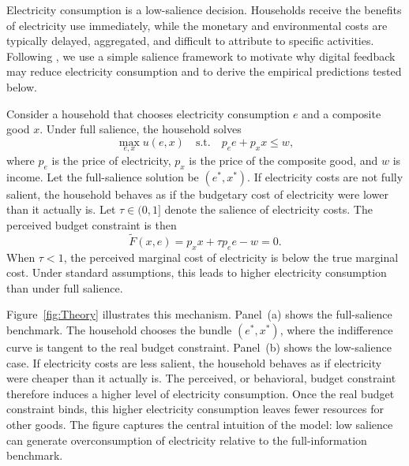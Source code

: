 Electricity consumption is a low-salience decision. Households receive the benefits of electricity use immediately, while the monetary and environmental costs are typically delayed, aggregated, and difficult to attribute to specific activities. Following \citet{alcocerSalienceBiasFramework2024}, we use a simple salience framework to motivate why digital feedback may reduce electricity consumption and to derive the empirical predictions tested below.

Consider a household that chooses electricity consumption \(e\) and a composite good \(x\). Under full salience, the household solves
\[
\max_{e,x} u(e,x)
\quad \text{s.t.} \quad
p_e e + p_x x \leq w,
\]
where \(p_e\) is the price of electricity, \(p_x\) is the price of the composite good, and \(w\) is income. Let the full-salience solution be \((e^*,x^*)\). If electricity costs are not fully salient, the household behaves as if the budgetary cost of electricity were lower than it actually is. Let \(\tau \in (0,1]\) denote the salience of electricity costs. The perceived budget constraint is then
\[
\widetilde F(x,e)=p_xx+\tau p_e e-w=0.
\]
When \(\tau<1\), the perceived marginal cost of electricity is below the true marginal cost. Under standard assumptions, this leads to higher electricity consumption than under full salience.

Figure~\ref{fig:Theory} illustrates this mechanism. Panel~(a) shows the full-salience benchmark. The household chooses the bundle \((e^*,x^*)\), where the indifference curve is tangent to the real budget constraint. Panel~(b) shows the low-salience case. If electricity costs are less salient, the household behaves as if electricity were cheaper than it actually is. The perceived, or behavioral, budget constraint therefore induces a higher level of electricity consumption. Once the real budget constraint binds, this higher electricity consumption leaves fewer resources for other goods. The figure captures the central intuition of the model: low salience can generate overconsumption of electricity relative to the full-information benchmark.

